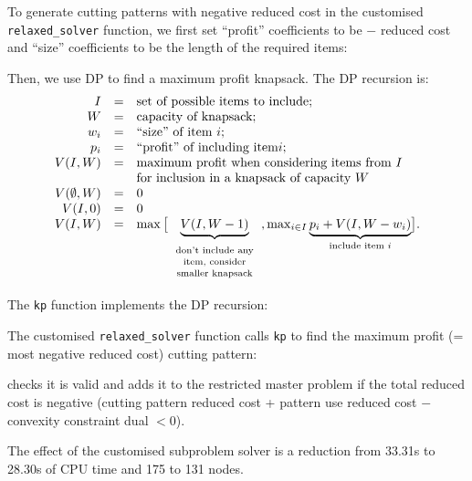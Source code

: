 To generate cutting patterns with negative reduced cost in the customised \texttt{relaxed\_solver} function, we first set ``profit'' coefficients to be $-$ reduced cost and ``size'' coefficients to be the length of the required items:


Then, we use \ac{DP} to find a maximum profit knapsack. The \ac{DP} recursion is:
\[\begin{array}{rcl}
I &=& \text{set of possible items to include}; \\
W &=& \text{capacity of knapsack}; \\
w_i &=& \text{``size'' of item } i; \\
p_i &=& \text{``profit'' of including item} i; \\
V(I, W) &=& \text{maximum profit when considering items from $I$} \\
& &\text{for inclusion in a knapsack of capacity $W$} \\
V(\emptyset, W) &=& 0 \\
V(I, 0) &=& 0 \\
V(I, W) &=& \max\big[\underset{\text{\begin{tabular}{c}don't include any \\[-3pt] item, consider \\[-3pt] smaller knapsack \end{tabular}}}{\underbrace{V(I, W - 1)}}, \max_{i \in I} \underset{\text{include item $i$}}{\underbrace{p_i + V(I, W - w_i)}} \big].
\end{array}\]

\newpage

The \texttt{kp} function implements the \ac{DP} recursion:


The customised \texttt{relaxed\_solver} function calls \texttt{kp} to find the maximum profit (= most negative reduced cost) cutting pattern:

checks it is valid and adds it to the restricted master problem if the total reduced cost is negative (cutting pattern reduced cost + pattern use reduced cost $-$ convexity constraint dual $< 0$).


The effect of the customised subproblem solver is a reduction from 33.31s to 28.30s of CPU time and 175 to 131 nodes.

\begin{comment}
\subsection{Customised Column Generation for the Wedding Planner problem} \label{sbs:wed_cols}
\end{comment}